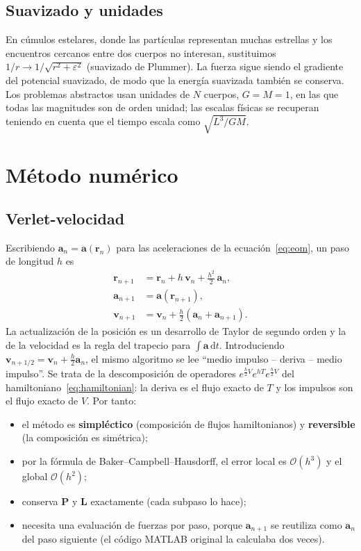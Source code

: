 \documentclass[11pt,a4paper]{article}
\newcommand{\vect}[1]{\mathbf{#1}}
\newcommand{\dd}{\mathrm{d}}
\begin{document}
\subsection{Suavizado y unidades}

En cúmulos estelares, donde las partículas representan muchas estrellas y los encuentros
cercanos entre dos cuerpos no interesan, sustituimos $1/r\to1/\sqrt{r^2+\varepsilon^2}$
(suavizado de Plummer). La fuerza sigue siendo el gradiente del potencial suavizado, de modo
que la energía suavizada también se conserva. Los problemas abstractos usan unidades de
$N$ cuerpos, $G=M=1$, en las que todas las magnitudes son de orden unidad; las escalas
físicas se recuperan teniendo en cuenta que el tiempo escala como $\sqrt{L^3/GM}$.

\section{Método numérico}\label{sec:numerics}

\subsection{Verlet-velocidad}\label{sec:verlet}

Escribiendo $\vect a_n=\vect a(\vect r_n)$ para las aceleraciones de la
ecuación~\eqref{eq:eom}, un paso de longitud $h$ es
\begin{align}
  \vect r_{n+1}&=\vect r_n+h\,\vect v_n+\tfrac{h^2}{2}\,\vect a_n, \label{eq:verlet1}\\
  \vect a_{n+1}&=\vect a(\vect r_{n+1}), \\
  \vect v_{n+1}&=\vect v_n+\tfrac{h}{2}\left(\vect a_n+\vect a_{n+1}\right). \label{eq:verlet3}
\end{align}
La actualización de la posición es un desarrollo de Taylor de segundo orden y la de la
velocidad es la regla del trapecio para $\int\vect a\,\dd t$. Introduciendo
$\vect v_{n+1/2}=\vect v_n+\tfrac h2\vect a_n$, el mismo algoritmo se lee ``medio impulso --
deriva -- medio impulso''. Se trata de la descomposición de operadores
$e^{\frac h2 V}e^{hT}e^{\frac h2 V}$ del hamiltoniano~\eqref{eq:hamiltonian}: la deriva es
el flujo exacto de $T$ y los impulsos son el flujo exacto de $V$. Por tanto:
\begin{itemize}
  \item el método es \textbf{simpléctico} (composición de flujos hamiltonianos) y
        \textbf{reversible} (la composición es simétrica);
  \item por la fórmula de Baker--Campbell--Hausdorff, el error local es $\mathcal O(h^3)$ y
        el global $\mathcal O(h^2)$;
  \item conserva $\vect P$ y $\vect L$ exactamente (cada subpaso lo hace);
  \item necesita una evaluación de fuerzas por paso, porque $\vect a_{n+1}$ se reutiliza
        como $\vect a_n$ del paso siguiente (el código MATLAB original la calculaba dos veces).
\end{itemize}
\end{document}
